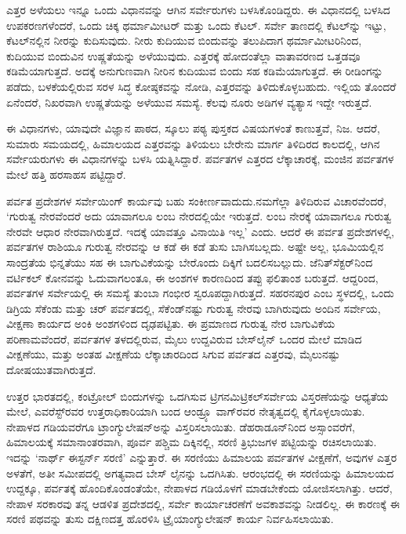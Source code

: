 \vskip 3pt

ಎತ್ತರ ಅಳೆಯಲು ಇನ್ನೂ ಒಂದು ವಿಧಾನವನ್ನು ಆಗಿನ ಸರ್ವೇರುಗಳು ಬಳಸಿಕೊಂಡಿದ್ದರು. ಈ ವಿಧಾನದಲ್ಲಿ ಬಳಸಿದ ಉಪಕರಣಗಳೆಂದರೆ, ಒಂದು ಚಿಕ್ಕ ಥರ್ಮಾಮೀಟರ್​ ಮತ್ತು ಒಂದು ಕೆಟಲ್​. ಸರ್ವೇ ತಾಣದಲ್ಲಿ ಕೆಟಲ್​ನ್ನು ಇಟ್ಟು, ಕೆಟಲ್​ನಲ್ಲಿನ ನೀರನ್ನು ಕುದಿಸುವುದು. ನೀರು ಕುದಿಯುವ ಬಿಂದುವನ್ನು ತಲುಪಿದಾಗ ಥರ್ಮಾಮೀಟರಿನಿಂದ, ಕುದಿಯುವ ಬಿಂದುವಿನ ಉಷ್ಣತೆಯನ್ನು ಅಳೆಯುವುದು. ಎತ್ತರಕ್ಕೆ ಹೋದಂತೆಲ್ಲಾ ವಾತಾವರಣದ ಒತ್ತಡವೂ ಕಡಿಮೆಯಾಗುತ್ತದೆ. ಅದಕ್ಕೆ ಅನುಗುಣವಾಗಿ ನೀರಿನ ಕುದಿಯುವ ಬಿಂದು ಸಹ ಕಡಿಮೆಯಾಗುತ್ತದೆ. ಈ ರೀಡಿಂಗನ್ನು ಪಡೆದು, ಬಳಕೆಯಲ್ಲಿರುವ ಸರಳ ಸಿದ್ಧ ಕೋಷ್ಠಕವನ್ನು ನೋಡಿ, ಎತ್ತರವನ್ನು ತಿಳಿದುಕೊಳ್ಳಬಹುದು. ಇಲ್ಲಿಯ ತೊಂದರೆ ಏನೆಂದರೆ, ನಿಖರವಾಗಿ ಉಷ್ಣತೆಯನ್ನು ಅಳೆಯುವ ಸಮಸ್ಯೆ. ಕೆಲವು ನೂರು ಅಡಿಗಳ ವ್ಯತ್ಯಾಸ ಇದ್ದೇ ಇರುತ್ತದೆ.

\newpage

ಈ ವಿಧಾನಗಳು, ಯಾವುದೇ ವಿಜ್ಞಾನ ಪಾಠದ, ಸ್ಕೂಲು ಪಠ್ಯ ಪುಸ್ತಕದ ವಿಷಯಗಳಂತೆ ಕಾಣುತ್ತವೆ, ನಿಜ. ಆದರೆ, ಸುಮಾರು  ಸಮಯದಲ್ಲಿ, ಹಿಮಾಲಯದ ಎತ್ತರವನ್ನು ತಿಳಿಯಲು ಬೇರೇನು ಮಾರ್ಗ ತಿಳಿದಿರದ ಕಾಲದಲ್ಲಿ, ಆಗಿನ ಸರ್ವೇಯರುಗಳು ಈ ವಿಧಾನಗಳನ್ನು ಬಳಸಿ ಯತ್ನಿಸಿದ್ದಾರೆ. ಪರ್ವತಗಳ ಎತ್ತರದ ಲೆಕ್ಕಾಚಾರಕ್ಕೆ, ಮಂಜಿನ ಪರ್ವತಗಳ ಮೇಲೆ ಹತ್ತಿ ಹರಸಾಹಸ ಪಟ್ಟಿದ್ದಾರೆ.

\vskip 5pt

ಪರ್ವತ ಪ್ರದೇಶಗಳ ಸರ್ವೇಯಿಂಗ್​ ಕಾರ್ಯವು ಬಹು ಸಂಕೀರ್ಣವಾದುದು.\break ನಮಗೆಲ್ಲಾ ತಿಳಿದಿರುವ ವಿಚಾರವೆಂದರೆ, ‘ಗುರುತ್ವ ನೇರವೆಂದರೆ ಅದು ಯಾವಾಗಲೂ ಲಂಬ ನೇರದಲ್ಲಿಯೇ ಇರುತ್ತದೆ. ಲಂಬ ನೇರಕ್ಕೆ ಯಾವಾಗಲೂ ಗುರುತ್ವ ನೇರವೇ ಆಧಾರ ನೇರವಾಗಿರುತ್ತದೆ. ಇದಕ್ಕೆ ಯಾವತ್ತೂ ವಿನಾಯಿತಿ ಇಲ್ಲ’ ಎಂದು. ಆದರೆ ಈ ಪರ್ವತ ಪ್ರದೇಶಗಳಲ್ಲಿ, ಪರ್ವತಗಳ ರಾಶಿಯೂ ಗುರುತ್ವ ನೇರವನ್ನು ಆ ಕಡೆ ಈ ಕಡೆ ತುಸು ಬಾಗಿಸಬಲ್ಲದು. ಅಷ್ಟೇ ಅಲ್ಲ, ಭೂಮಿಯಲ್ಲಿನ ಸಾಂದ್ರತೆಯ ಭಿನ್ನತೆಯು ಸಹ ಈ ಬಾಗುವಿಕೆಯನ್ನು ಬೇರೊಂದು ದಿಕ್ಕಿಗೆ ಬದಲಿಸಬಲ್ಲುದು. ಜೆನಿತ್​ ಸೆಕ್ಟರ್​ನಿಂದ ವರ್ಟಿಕಲ್​ ಕೋನವನ್ನು ಓದುವಾಗಲಂತೂ, ಈ ಅಂಶಗಳ ಕಾರಣದಿಂದ ತಪ್ಪು ಫಲಿತಾಂಶ ಬರುತ್ತದೆ. ಆದ್ದರಿಂದ, ಪರ್ವತಗಳ ಸರ್ವೇಯಲ್ಲಿ ಈ ಸಮಸ್ಯೆ ತುಂಬಾ ಗಂಭೀರ ಸ್ವರೂಪದ್ದಾಗಿರುತ್ತದೆ. ಸಹರನಪುರ ಎಂಬ ಸ್ಥಳದಲ್ಲಿ, ಒಂದು ಡಿಗ್ರಿಯ  ಸೆಕೆಂಡು ಮತ್ತು ಚರ್​ ಪರ್ವತದಲ್ಲಿ,  ಸೆಕೆಂಡ್​ನಷ್ಟು ಗುರುತ್ವ ನೇರವು ಬಾಗಿರುವುದು ಅಂದಿನ ಸರ್ವೇಯ, ವೀಕ್ಷಣಾ ಕಾರ್ಯದ ಅಂಕಿ ಅಂಶಗಳಿಂದ ದೃಢಪಟ್ಟಿತು. ಈ ಪ್ರಮಾಣದ ಗುರುತ್ವ ನೇರ ಬಾಗುವಿಕೆಯ ಪರಿಣಾಮವೆಂದರೆ, ಪರ್ವತಗಳ ತಳದಲ್ಲಿರುವ,  ಮೈಲು ಉದ್ದವಿರುವ ಬೇಸ್​ಲೈನ್​ ಒಂದರ ಮೇಲೆ ಮಾಡಿದ ವೀಕ್ಷಣೆಯು, ಮತ್ತು ಅಂತಹ ವೀಕ್ಷಣೆಯ ಲೆಕ್ಕಾಚಾರದಿಂದ ಸಿಗುವ ಪರ್ವತದ ಎತ್ತರವು,  ಮೈಲುನಷ್ಟು ದೋಷಯುತವಾಗಿರುತ್ತದೆ.

\vskip 5pt

ಉತ್ತರ ಭಾರತದಲ್ಲಿ, ಕಂಟ್ರೋಲ್​ ಬಿಂದುಗಳನ್ನು ಒದಗಿಸುವ ಟ್ರಿಗನಮಿಟ್ರಿಕಲ್​\break ಸರ್ವೇಯ ವಿಸ್ತರಣೆಯನ್ನು ಆಧ್ಯತೆಯ ಮೇಲೆ, ಎವರೆಸ್ಟ್​ರವರ ಉತ್ತರಾಧಿಕಾರಿಯಾಗಿ ಬಂದ ಆಂಡ್ರ್ಯೂ ವಾಗ್​ರವರ ನೇತೃತ್ವದಲ್ಲಿ ಕೈಗೊಳ್ಳಲಾಯಿತು. ನೇಪಾಳದ ಗಡಿಯವರೆಗೂ ಟ್ರಾಂಗ್ಯುಲೇಷನ್​ಅನ್ನು ವಿಸ್ತರಿಸಲಾಯಿತು. ಡೆಹರಾಡೂನ್​ನಿಂದ ಅಸ್ಸಾಂವರೆಗೆ, ಹಿಮಾಲಯಕ್ಕೆ ಸಮಾನಾಂತರವಾಗಿ, ಪೂರ್ವ ಪಶ್ಚಿಮ ದಿಕ್ಕಿನಲ್ಲಿ, ಸರಣಿ ತ್ರಿಭುಜಗಳ ಪಟ್ಟಿಯನ್ನು ರಚಿಸಲಾಯಿತು. ಇದನ್ನು ‘ನಾರ್ಥ್ ಈಸ್ಟರ್ನ್ ಸರಣಿ’ ಎನ್ನುತ್ತಾರೆ. ಈ ಸರಣಿಯು ಹಿಮಾಲಯ ಪರ್ವತಗಳ ವೀಕ್ಷಣೆಗೆ, ಅವುಗಳ ಎತ್ತರ ಅಳತೆಗೆ, ಅತೀ ಸಮೀಪದಲ್ಲಿ ಅಗತ್ಯವಾದ ಬೇಸ್​ ಲೈನನ್ನು ಒದಗಿಸಿತು. ಆರಂಭದಲ್ಲಿ ಈ ಸರಣಿಯನ್ನು ಹಿಮಾಲಯದ ಉದ್ದಕ್ಕೂ, ಪರ್ವತಕ್ಕೆ ಹೊಂದಿಕೊಂಡಂತೆಯೇ, ನೇಪಾಳದ ಗಡಿಯೊಳಗೆ ಮಾಡಬೇಕೆಂದು ಯೋಜಿಸಲಾಗಿತ್ತು. ಆದರೆ, ನೇಪಾಳ ಸರಕಾರವು ತನ್ನ ಆಡಳಿತ ಪ್ರದೇಶದಲ್ಲಿ, ಸರ್ವೇ ಕಾರ್ಯಾಚರಣೆಗೆ ಅವಕಾಶವನ್ನು ನೀಡಲಿಲ್ಲ. ಈ ಕಾರಣಕ್ಕೆ ಈ ಸರಣಿ ಪಥವನ್ನು ತುಸು ದಕ್ಷಿಣದತ್ತ ಹೊರಳಿಸಿ ಟ್ರೈಯಾಂಗ್ಯುಲೇಷನ್​ ಕಾರ್ಯ ನಿರ್ವಹಿಸಲಾಯಿತು.

